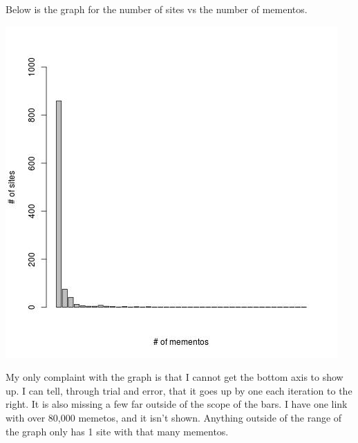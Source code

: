 \documentclass{article}
\begin{document}
Below is the graph for the number of sites vs the number of mementos.
\begin{center}
\includegraphics[scale=0.6]{images/plot1.jpeg}
\end{center}

My only complaint with the graph is that I cannot get the bottom axis to show up. I can tell, through trial and error, that it goes up by one each iteration to the right. It is also missing a few far outside of the scope of the bars. I have one link with over 80,000 memetos, and it isn't shown. Anything outside of the range of the graph only has 1 site with that many mementos. 
\end{document}
